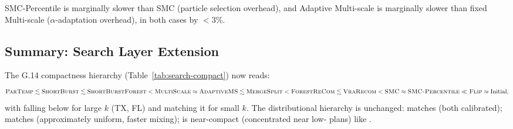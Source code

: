 SMC-Percentile is marginally slower than SMC (particle selection overhead),
and Adaptive Multi-scale is marginally slower than fixed Multi-scale
($\alpha$-adaptation overhead), in both cases by $< 3\%$.

\subsection{Summary: Search Layer Extension}

The G.14 compactness hierarchy (Table~\ref{tab:search-compact}) now reads:
\[
  \textsc{ParTemp}{} \lesssim \textsc{ShortBurst}{} \lesssim \textsc{ShortBurstForest}{} < \textsc{MultiScale}{} \approx \textsc{AdaptiveMS}{}
  \lesssim \textsc{MergeSplit}{} < \textsc{ForestReCom}{} \lesssim \textsc{VraRecom}{} < \textsc{SMC}{} \approx \textsc{SMC-Percentile}{}
  \ll \textsc{Flip}{} \approx \text{Initial},
\]
with \pt{} falling below \sburst{} for large $k$ (TX, FL) and matching it
for small $k$.
The distributional hierarchy is unchanged: \smcp{} matches \smc{} (both
calibrated); \ams{} matches \ms{} (approximately uniform, faster mixing);
\pt{} is near-compact (concentrated near low-\ec{} plans) like \sburst{}.
